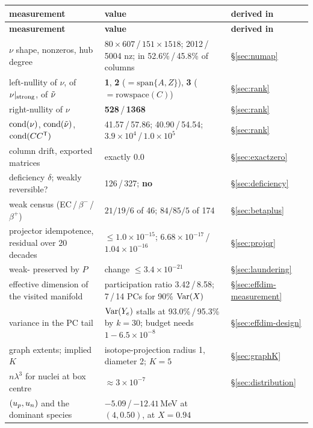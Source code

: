\begingroup
\small
\begin{longtable}{@{}L{6.6cm} L{4.6cm} L{3.4cm}@{}}
\toprule
\textbf{measurement} & \textbf{value} & \textbf{derived in} \\
\midrule
\endfirsthead
\toprule
\textbf{measurement} & \textbf{value} & \textbf{derived in} \\
\midrule
\endhead
\bottomrule
\endfoot

$\nu$ shape, nonzeros, hub degree &
  $80\times607$\,/\,$151\times1518$; 2012\,/\,5004 nz;  in
  52.6\%\,/\,45.8\% of columns & \S\ref{sec:numap} \\
left-nullity of $\nu$, of $\nu|_{\rm strong}$, of $\tilde\nu$ &
  \textbf{1}, \textbf{2} ($= \mathrm{span}\{A,Z\}$), \textbf{3}
  ($= \mathrm{rowspace}(C)$) & \S\ref{sec:rank} \\
right-nullity of $\nu$ &
  \textbf{528}\,/\,\textbf{1368} & \S\ref{sec:rank} \\
$\operatorname{cond}(\nu)$, $\operatorname{cond}(\tilde\nu)$, $\operatorname{cond}(CC^{\mathsf{T}})$ &
  41.57\,/\,57.86; 40.90\,/\,54.54; $3.9\times10^{4}$\,/\,$1.0\times10^{5}$ &
  \S\ref{sec:rank} \\
column drift, exported matrices &
  exactly 0.0 & \S\ref{sec:exactzero} \\
deficiency $\delta$; weakly reversible? &
  126\,/\,327; \textbf{no} & \S\ref{sec:deficiency} \\
weak census (EC\,/\,$\beta^-$\,/\,$\beta^+$) &
  $21/19/6$ of 46; $84/85/5$ of 174 & \S\ref{sec:betaplus} \\
projector idempotence, residual over 20 decades &
  $\le 1.0\times10^{-15}$; $6.68\times10^{-17}$\,/\,$1.04\times10^{-16}$ &
  \S\ref{sec:projqr} \\
weak-\dYe{} preserved by $P$ &
  change $\le 3.4\times10^{-21}$ & \S\ref{sec:laundering} \\
effective dimension of the visited manifold &
  participation ratio 3.42\,/\,8.58; 7\,/\,14 PCs for 90\% $\operatorname*{Var}(X)$ &
  \S\ref{sec:effdim-measurement} \\
\Ye{} variance in the PC tail &
  $\operatorname*{Var}(Y_{e})$ stalls at 93.0\%\,/\,95.3\% by $k = 30$; budget needs
  $1 - 6.5\times10^{-8}$ & \S\ref{sec:effdim-design} \\
graph extents; implied $K$ &
  isotope-projection radius 1, diameter 2; $K = 5$ & \S\ref{sec:graphK} \\
$n\lambda^3$ for nuclei at box centre &
  $\approx 3\times10^{-7}$ & \S\ref{sec:distribution} \\
$(u_{p}, u_{n})$ and the dominant species &
  $-5.09$\,/\,$-12.41$\,MeV at $(4, 0.50)$,  at $X = 0.94$ &

\end{longtable}
